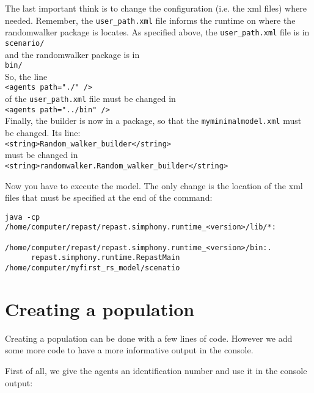 \documentclass{article}
\begin{document}
The last important think is to change the configuration (i.e. the xml files) where needed. Remember, the \verb+user_path.xml+ file informs the runtime on where the randomwalker package is locates. As specified above, the \verb+user_path.xml+ file is in\\
\verb+scenario/+\\
and the randomwalker package is in\\
\verb+bin/+\\

So, the line\\
\verb+<agents path="./" />+\\
of the \verb+user_path.xml+ file must be changed in\\
\verb+<agents path="../bin" />+\\

Finally, the builder is now in a package, so that the \verb+myminimalmodel.xml+ must be changed. Its line:\\
\verb+<string>Random_walker_builder</string>+\\
must be changed in\\
\verb+<string>randomwalker.Random_walker_builder</string>+


Now you have to execute the model. The only change is the location of the xml files that must be specified at the end of the command:
\begin{verbatim}
java -cp /home/computer/repast/repast.simphony.runtime_<version>/lib/*:
          /home/computer/repast/repast.simphony.runtime_<version>/bin:. 
	  repast.simphony.runtime.RepastMain /home/computer/myfirst_rs_model/scenatio
\end{verbatim}


\section{Creating a population}

Creating a population can be done with a few lines of code. However we add some more code to have a more informative output in the console.

First of all, we give the agents an identification number and use it in the console output:
\end{document}
